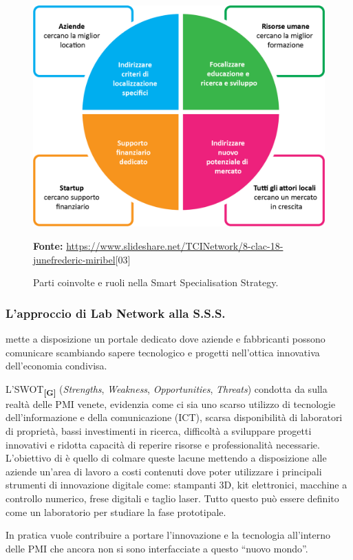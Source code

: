 \begin{figure}[H]
	\begin{center}
	\includegraphics[scale=0.37]{immagini/sss_graph.png}
	\caption{Parti coinvolte e ruoli nella Smart Specialisation Strategy.}
	\small{\textbf{Fonte:} \url{https://www.slideshare.net/TCINetwork/8-clac-18-junefrederic-miribel}[03]}	
	\end{center}
\end{figure}
\subsubsection{L'approccio di Lab Network alla S.S.S.}
\lab{} mette a disposizione un portale dedicato dove aziende e fabbricanti possono comunicare scambiando sapere tecnologico e progetti nell'ottica innovativa dell'economia condivisa.

L'\gls{SWOT}\textbf{\textsubscript{[G]}} (\textit{Strengths}, \textit{Weakness}, \textit{Opportunities}, \textit{Threats}) condotta da \lab{} sulla realtà delle PMI venete, evidenzia come ci sia uno scarso utilizzo di tecnologie dell'informazione e della comunicazione (ICT), scarsa disponibilità di laboratori di proprietà, bassi investimenti in ricerca, difficoltà a sviluppare progetti innovativi e ridotta capacità di reperire risorse e professionalità necessarie. 
L'obiettivo di \lab{} è quello di colmare queste lacune mettendo a disposizione alle aziende un'area di lavoro a costi contenuti dove poter utilizzare i principali strumenti di innovazione digitale come: stampanti 3D, kit elettronici, macchine a controllo numerico, frese digitali e taglio laser. Tutto questo può essere definito come un laboratorio per studiare la fase prototipale.

In pratica \lab{} vuole contribuire a portare l'innovazione e la tecnologia all'interno delle PMI che ancora non si sono interfacciate a questo ``nuovo mondo''.
\newpage